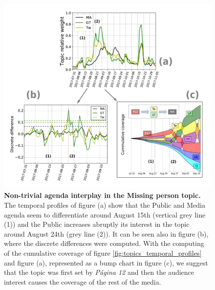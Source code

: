 \documentclass{bmcart}
\begin{document}
\begin{backmatter}
\begin{figure}[h!]
\includegraphics[width = \textwidth]{Fig8.pdf}
\caption{\textbf{Non-trivial agenda interplay in the Missing person topic.}
The temporal profiles of figure (a) show that the Public and Media agenda seem to differentiate around August 15th (vertical grey line (1)) and the Public increases abruptly its interest in the topic around August 24th (grey line (2)). It can be seen also in figure (b), where the discrete differences were computed. 
With the computing of the cumulative coverage of figure \ref{fig:topics_temporal_profiles} and figure (a), represented as a bump chart in figure (c), we suggest that the topic was first set by \emph{P\'agina 12} and then the audience interest causes the coverage of the rest of the media.
}
\label{fig:Maldonado_setagenda}
\end{figure}


\end{backmatter}
\end{document}
